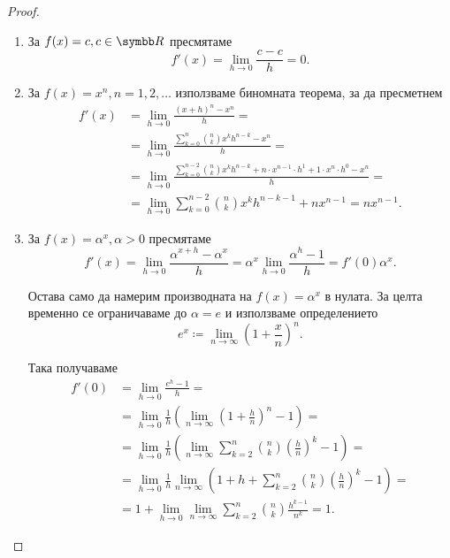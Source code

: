 \documentclass[numbers=endperiod, bibliography=totocnumbered]{scrartcl}
\begin{document}
\begin{proof}
  \mbox{}
  \begin{enumerate}
    \item За \( f(x) = c, c \in \R \) пресмятаме
    \begin{equation*}
      f'(x) = \lim_{h \to 0} \frac {c - c} h = 0.
    \end{equation*}

    \item За \( f(x) = x^n, n = 1, 2, \ldots \) използваме биномната теорема, за да пресметнем
    \begin{align*}
      f'(x)
      &=
      \lim_{h \to 0} \frac {{(x+h)}^n - x^n} h
      = \\ &=
      \lim_{h \to 0} \frac {\sum_{k=0}^n \binom{n}{k} x^k h^{n-k} - x^n} h
      = \\ &=
      \lim_{h \to 0} \frac {\sum_{k=0}^{n-2} \binom{n}{k} x^k h^{n-k} + n \cdot x^{n-1} \cdot h^1 + 1 \cdot x^n \cdot h^0 - x^n} h
      = \\ &=
      \lim_{h \to 0} \sum_{k=0}^{n-2} \binom{n}{k} x^k h^{n-k-1} + n x^{n-1}
      =
      n x^{n-1}.
    \end{align*}

    \item За \( f(x) = \alpha^x, \alpha > 0 \) пресмятаме
    \begin{equation*}
      f'(x)
      =
      \lim_{h \to 0} \frac {\alpha^{x+h} - \alpha^x} h
      =
      \alpha^x \lim_{h \to 0} \frac {\alpha^h - 1} h
      =
      f'(0) \alpha^x.
    \end{equation*}

    Остава само да намерим производната на \( f(x) = \alpha^x \) в нулата. За целта временно се ограничаваме до \( \alpha = e \) и използваме определението
    \begin{equation*}
      e^x \coloneqq \lim_{n \to \infty} {\left( 1 + \frac x n \right)}^n.
    \end{equation*}

    Така получаваме
    \begin{align*}
      f'(0)
      &=
      \lim_{h \to 0} \frac {e^h - 1} h
      = \\ &=
      \lim_{h \to 0} \frac 1 h \left( \lim_{n \to \infty} {\left( 1 + \frac h n \right)}^n - 1 \right)
      = \\ &=
      \lim_{h \to 0} \frac 1 h \left( \lim_{n \to \infty} \sum_{k=2}^n \binom{n}{k} {\left(\frac h n \right)}^k - 1 \right)
      = \\ &=
      \lim_{h \to 0} \frac 1 h \lim_{n \to \infty} \left( 1 + h + \sum_{k=2}^n \binom{n}{k} {\left(\frac h n \right)}^k - 1 \right)
      = \\ &=
      1 + \lim_{h \to 0} \lim_{n \to \infty} \sum_{k=2}^n \binom{n}{k} \frac {h^{k-1}} {n^k} = 1.
    \end{align*}


\end{enumerate}
\end{proof}
\end{document}
